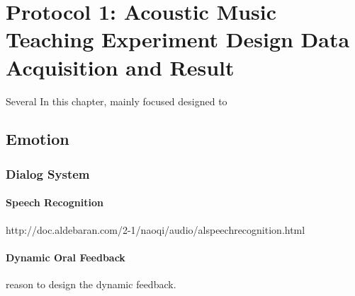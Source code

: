 \chapter{Protocol 1: Acoustic Music Teaching Experiment Design Data Acquisition and Result}
Several 
In this chapter, mainly focused designed to 

\section{Emotion}
\subsection{Dialog System}

\subsubsection{Speech Recognition}
http://doc.aldebaran.com/2-1/naoqi/audio/alspeechrecognition.html

\subsubsection{Dynamic Oral Feedback}
reason to design the dynamic feedback. 

\
